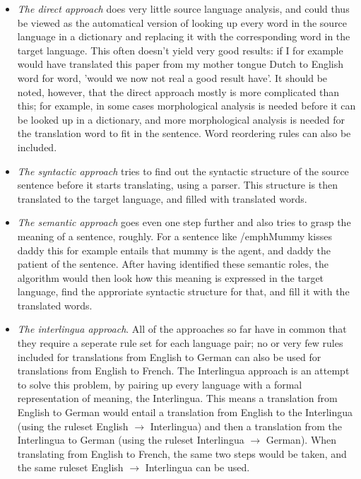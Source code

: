 \documentclass[12pt]{article}
\begin{document}
\begin{itemize}
\item \emph{The direct approach} does very little source language analysis, and could thus be viewed as the automatical version of looking up every word in the source language in a dictionary and replacing it with the corresponding word in the target language. This often doesn't yield very good results: if I for example would have translated this paper from my mother tongue Dutch to English word for word, 'would we now not real a good result have'. It should be noted, however, that the direct approach mostly is more complicated than this; for example, in some cases morphological analysis is needed before it can be looked up in a dictionary, and more morphological analysis is needed for the translation word to fit in the sentence. Word reordering rules can also be included.
\item \emph{The syntactic approach} tries to find out the syntactic structure of the source sentence before it starts translating, using a parser. This structure is then translated to the target language, and filled with translated words.
\item \emph{The semantic approach} goes even one step further and also tries to grasp the meaning of a sentence, roughly. For a sentence like /emph{Mummy kisses daddy} this for example entails that mummy is the agent, and daddy the patient of the sentence. After having identified these semantic roles, the algorithm would then look how this meaning is expressed in the target language, find the approriate syntactic structure for that, and fill it with the translated words.
\item \emph{The interlingua approach}. All of the approaches so far have in common that they require a seperate rule set for each language pair; no or very few rules included for translations from English to German can also be used for translations from English to French. The Interlingua approach is an attempt to solve this problem, by pairing up every language with a formal representation of meaning, the Interlingua. This means a translation from English to German would entail a translation from English to the Interlingua (using the ruleset English $\rightarrow$ Interlingua) and then a translation from the Interlingua to German (using the ruleset Interlingua $\rightarrow$ German). When translating from English to French, the same two steps would be taken, and the same ruleset English $\rightarrow$ Interlingua can be used. 
\end{itemize}
\end{document}
